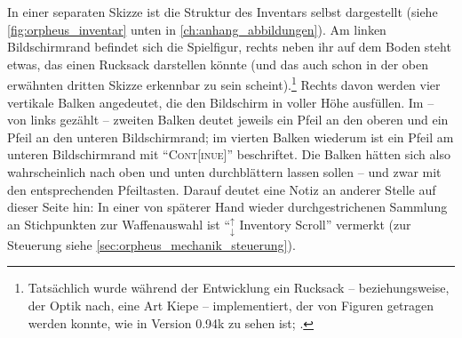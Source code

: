 \documentclass[a5paper,pagesize,numbers=noenddot]{scrbook}
\begin{document}
In einer separaten Skizze ist die Struktur des Inventars selbst dargestellt (siehe \autoref{fig:orpheus_inventar} unten in \autoref{ch:anhang_abbildungen}).
Am linken Bildschirmrand befindet sich die Spielfigur, rechts neben ihr auf dem Boden steht etwas, das einen Rucksack darstellen könnte (und das auch schon in der oben erwähnten dritten Skizze erkennbar zu sein scheint).\footnote{Tatsächlich wurde während der Entwicklung ein Rucksack -- beziehungsweise, der Optik nach, eine Art Kiepe -- implementiert, der von Figuren getragen werden konnte, wie in Version 0.94k zu sehen ist; \autocite[vgl. bspw.][]{alpha_backpack_2023}.}
Rechts davon werden vier vertikale Balken angedeutet, die den Bildschirm in voller Höhe ausfüllen.
Im -- von links gezählt -- zweiten Balken deutet jeweils ein Pfeil an den oberen und ein Pfeil an den unteren Bildschirmrand; im vierten Balken wiederum ist ein Pfeil am unteren Bildschirmrand mit \enquote{\textsc{Cont[inue]}} beschriftet.
Die Balken hätten sich also wahrscheinlich nach oben und unten durchblättern lassen sollen -- und zwar mit den entsprechenden Pfeiltasten.
Darauf deutet eine Notiz an anderer Stelle auf dieser Seite hin:
In einer von späterer Hand wieder durchgestrichenen Sammlung an Stichpunkten zur Waffenauswahl ist \enquote{$_{\downarrow}^{\uparrow}$ Inventory Scroll} vermerkt (zur Steuerung siehe \autoref{sec:orpheus_mechanik_steuerung}).\autocite[S.~7]{orpheus_interface}
\end{document}
